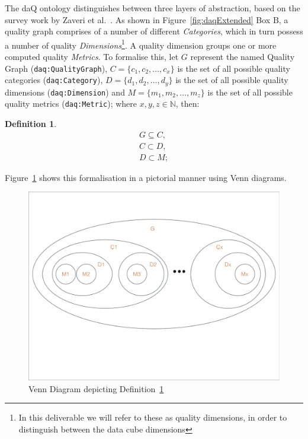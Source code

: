 The daQ ontology distinguishes between three layers of abstraction, based on the survey work by Zaveri et al.~\cite{Zaveri2012:LODQ}.
As shown in Figure~\ref{fig:daqExtended} Box B, a quality graph comprises of a number of different \emph{Categories}, which in turn possess a number of quality \emph{Dimensions}\footnote{In this deliverable we will refer to these as quality dimensions, in order to distinguish between the data cube dimensions}.
A quality dimension groups one or more computed quality \emph{Metrics}.
To formalise this, let $G$ represent the named Quality Graph (\texttt{daq:QualityGraph}), $C = \lbrace c_1, c_2,  \dots , c_x\rbrace$ is the set of all possible quality categories (\texttt{daq:Category}), $D = \lbrace d_1, d_2, \dots , d_y\rbrace$ is the set of all possible quality dimensions (\texttt{daq:Dimension}) and $M = \lbrace m_1, m_2, \dots , m_z\rbrace$ is the set of all possible quality metrics (\texttt{daq:Metric}); where $x,y,z\in \mathbb{N}$, then:

\newtheorem{Def1}{Definition}
\begin{Def1}
\label{def:daq_formalisation}
\begin{align*}
G \subseteq C, \\ 
C \subset D,\\
D \subset M; 
\end{align*}
\end{Def1}

Figure~\ref{fig:venn} shows this formalisation in a pictorial manner using Venn diagrams.

\begin{figure}[tbph]
\center
\includegraphics[scale=0.3]{images/venn.pdf} 
\caption{Venn Diagram depicting Definition~\ref{def:daq_formalisation} }
\label{fig:venn}
\end{figure}

